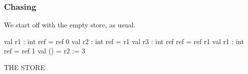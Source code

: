 \documentclass[aspectratio=169, handout]{beamer}
\newcommand{\topthing}[2]{
      \begin{minipage}[t][#1][t]{\textwidth}
        \vspace{\fill}
        #2
        \vspace{\fill}
      \end{minipage}
    }
\begin{document}
\begin{frame}[fragile]
  \frametitle{ Chasing}

  \topthing{0.2in}{
    We start off with the empty store, as usual.
  }

  \vspace{10pt}

  \begin{center}
    \begin{minipage}[t][2.1in][t]{0.6\textwidth}
      \vspace{\fill}
      \begin{codeblock}
        val r1 : int ref     = ref 0
        val r2 : int ref     = r1
        val r3 : int ref ref = ref r1
        val r1 : int ref     = ref 1
        val ()               = r2 := 3
      \end{codeblock}
      \vspace{\fill}
    \end{minipage}
    \hfill\vline\hfill
    \begin{minipage}[t][2.1in][t]{0.3\textwidth}
      \centering
      {\hspace{-20pt}\color{gray} \large THE STORE}

      \vspace{\fill}
      \begin{tikzpicture}
      \end{tikzpicture}
      \vspace{\fill}
    \end{minipage}
  \end{center}
\end{frame}
\end{document}
